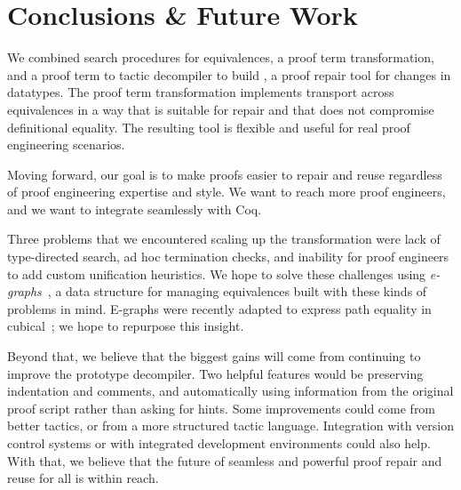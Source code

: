 \section{Conclusions \& Future Work}
\label{sec:discussion}

We combined search procedures for equivalences, a proof term transformation,
and a proof term to tactic decompiler to build \toolnamec,
a proof repair tool for changes in datatypes.
The proof term transformation implements transport across equivalences in a way that is suitable for repair
and that does not compromise definitional equality.
The resulting tool is flexible and useful for real proof engineering scenarios.



Moving forward, our goal is to make proofs easier to repair and reuse regardless of proof engineering expertise and style.
We want to reach more proof engineers, and we want \toolnamec to integrate seamlessly with Coq.

Three problems that we encountered scaling up the \toolnamec transformation were lack of type-directed search,
ad hoc termination checks, and inability for proof engineers to add custom unification heuristics.
We hope to solve these challenges using \textit{e-graphs}~\cite{egraph1},
a data structure %
for managing equivalences
built with these kinds of problems in mind.
E-graphs were recently adapted to express path equality in cubical~\cite{egraph6}; we hope to repurpose this insight.

Beyond that, we believe that the biggest gains will come from continuing to improve the prototype decompiler.
Two helpful features would be preserving indentation and comments, and automatically using information from the original proof script rather than asking for hints.
Some improvements could come from better tactics,
or from a more structured tactic language.
Integration with version control systems or with integrated development environments could also help.
With that, we believe that the future of seamless and powerful proof repair and reuse for all is within reach.


